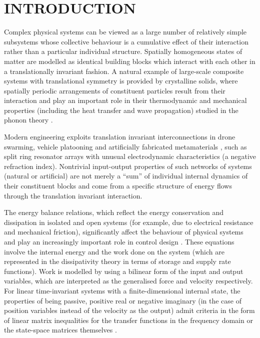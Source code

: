 \documentclass[letterpaper, 10pt, conference]{ieeeconf}  %
\begin{document}

\section{INTRODUCTION}

Complex physical systems can be viewed as a large number of relatively simple subsystems whose collective behaviour is a cumulative effect of their interaction rather than a particular individual  structure. Spatially homogeneous states of matter are modelled as identical building blocks which interact with each other in a translationally invariant fashion. A natural example of large-scale composite systems with translational symmetry is provided by crystalline solids, where spatially periodic arrangements of constituent particles result from their interaction and play an important role in their thermodynamic and mechanical properties (including the heat transfer and wave propagation) studied in the phonon theory  \cite{S_1990}.

Modern engineering exploits
translation  invariant interconnections  in drone swarming, vehicle  platooning and artificially fabricated metamaterials   \cite{VBSH_2006}, such as split ring resonator arrays with unusual electrodynamic characteristics (a negative refraction index). Nontrivial input-output properties of such networks of systems (natural or artificial) are not merely a ``sum'' of individual internal dynamics of their constituent blocks  and come from a specific structure of energy flows through the translation invariant interaction.

The energy balance relations,  which reflect the energy conservation and dissipation in isolated and open systems (for example, due to electrical resistance and mechanical friction), significantly affect the behaviour
of physical systems and play an increasingly important role in control design \cite{OVMM_2001,OVME_2002,VJ_2014}. These equations involve the internal energy and the work done on the system (which are represented in the dissipativity theory \cite{W_1972} in terms of storage and  supply rate functions). Work is modelled by using a bilinear form of the input and output variables, which are interpreted as the generalised force and velocity  respectively. For linear time-invariant systems with a finite-dimensional internal state,  the properties of being passive, positive real or negative imaginary (in the case of position variables instead of the velocity as the output) admit criteria in the form of linear matrix inequalities for the transfer functions in the frequency domain or the state-space matrices themselves \cite{PL_2010,XPL_2010}.
\end{document}
